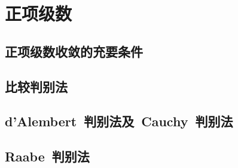 \section{正项级数}
\subsection{正项级数收敛的充要条件}
\subsection{比较判别法}
\subsection{d'Alembert~判别法及~Cauchy~判别法}
\subsection{Raabe~判别法}
